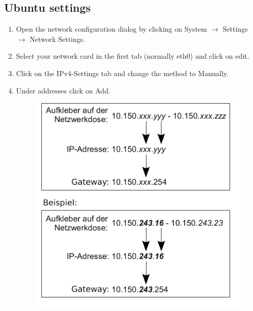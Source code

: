 \documentclass[a4paper,12pt]{scrartcl}
\begin{document}
\subsection*{Ubuntu settings}
\begin{enumerate}
    \item Open the network configuration dialog by clicking on System $\rightarrow$ Settings $\rightarrow$ Network Settings.
    \item Select your network card in the first tab (normally eth0) and click on edit.
    \item Click on the IPv4-Settings tab and change the method to Manually.
    \item Under addresses click on Add.
      \begin{figure}[h!]
        \centering
        \begin{minipage}[c]{0.45\linewidth}
          \centering
          \includegraphics[width=\linewidth,keepaspectratio]{Bilder/IP_Gerneric}
        \end{minipage}
        \begin{minipage}[c]{0.5\linewidth}
          \centering

\end{minipage}
\end{figure}
\end{enumerate}
\end{document}
